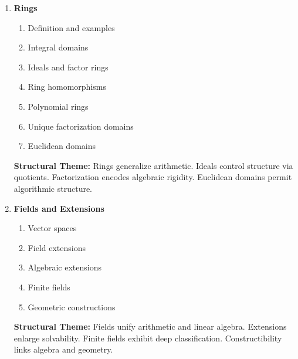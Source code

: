 \begin{enumerate}
\vspace{0.5em}
\textbf{Structural Theme:}
Groups formalize symmetry.
Cosets measure deviation from subgroup structure.
Normality permits quotient construction.
Homomorphisms reveal structural preservation.
Classification emerges in the finite abelian case.


\item \textbf{Rings}

\begin{enumerate}
    \item Definition and examples
    \item Integral domains
    \item Ideals and factor rings
    \item Ring homomorphisms
    \item Polynomial rings
    \item Unique factorization domains
    \item Euclidean domains
\end{enumerate}

\vspace{0.5em}
\textbf{Structural Theme:}
Rings generalize arithmetic.
Ideals control structure via quotients.
Factorization encodes algebraic rigidity.
Euclidean domains permit algorithmic structure.


\item \textbf{Fields and Extensions}

\begin{enumerate}
    \item Vector spaces
    \item Field extensions
    \item Algebraic extensions
    \item Finite fields
    \item Geometric constructions
\end{enumerate}

\vspace{0.5em}
\textbf{Structural Theme:}
Fields unify arithmetic and linear algebra.
Extensions enlarge solvability.
Finite fields exhibit deep classification.
Constructibility links algebra and geometry.


\end{enumerate}
